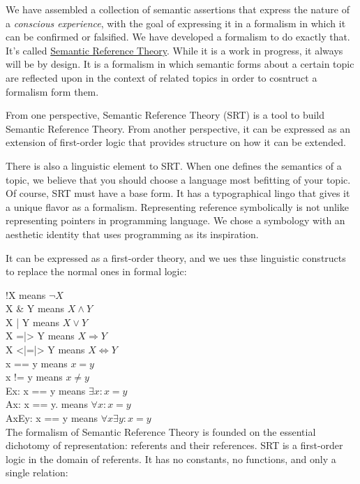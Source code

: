 \documentclass[runningheads]{llncs}
\begin{document}
We have assembled a collection of semantic assertions that express the nature of a \emph{conscious experience}, with the goal of expressing it in a formalism in which it can be confirmed or falsified. We have developed a formalism to do exactly that. It's called \href{https://github.com/DNA-Platform/inexplicable-phenomena/formalism/semantic-reference-theory/introduction.pdf}{Semantic Reference Theory}. While it is a work in progress, it always will be by design. It is a formalism in which semantic forms about a certain topic are reflected upon in the context of related topics in order to cosntruct a formalism form them. 

From one perspective, Semantic Reference Theory (SRT) is a tool to build Semantic Reference Theory. From another perspective, it can be expressed as an extension of first-order logic that provides structure on how it can be extended. 

There is also a linguistic element to SRT. When one defines the semantics of a topic, we believe that you should choose a language most befitting of your topic. Of course, SRT must have a base form. It has a typographical lingo that gives it a unique flavor as a formalism. Representing reference symbolically is not unlike representing pointers in programming language. We chose a symbology with an aesthetic identity that uses programming as its inspiration.

It can be expressed as a first-order theory, and we ues thse linguistic constructs to replace the normal ones in formal logic:

!X means $\neg X$ \\
X \& Y means $X \land Y$ \\
X | Y means $X \lor Y$ \\
X =|> Y means $X \Rightarrow Y$ \\
X <|=|> Y means $X \Leftrightarrow Y$ \\
x == y means $x = y$ \\
x != y means $x \neq y$ \\
Ex: x == y means $\exists x: x = y$ \\
Ax: x == y. means $\forall x: x = y$ \\
AxEy: x == y means $\forall x\exists y: x = y$ \\

The formalism of Semantic Reference Theory is founded on the essential dichotomy of representation: referents and their references. SRT is a first-order logic in the domain of referents. It has no constants, no functions, and only a single relation: 
\end{document}
